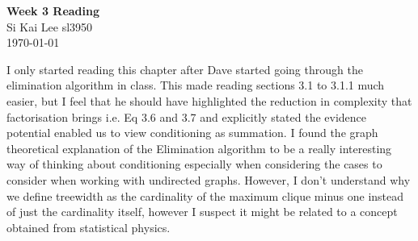 \documentclass[12pt]{article}
\begin{document}
\begin{center}
  \Large \textbf{Week 3 Reading} \\
  \vspace{0.1in}
  \normalsize Si Kai Lee sl3950 \\
  \today
\end{center}

I only started reading this chapter after Dave started going through the elimination algorithm in class. This made reading sections 3.1 to 3.1.1 much easier, but I feel that he should have highlighted the reduction in complexity that factorisation brings i.e. Eq 3.6 and 3.7 and explicitly stated the evidence potential enabled us to view conditioning as summation. I found the graph theoretical explanation of the Elimination algorithm to be a really interesting way of thinking about conditioning especially when considering the cases to consider when working with undirected graphs. However, I don't understand why we define treewidth as the cardinality of the maximum clique minus one instead of just the cardinality itself, however I suspect it might be related to a concept obtained from statistical physics.
\end{document}
